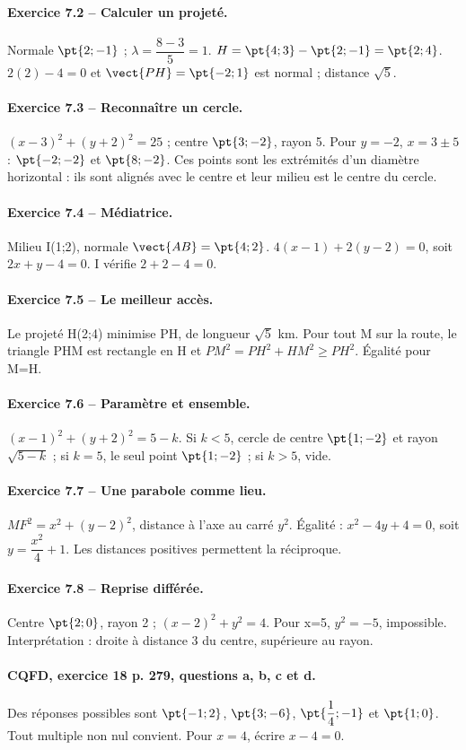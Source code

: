 \paragraph{Exercice 7.2 -- Calculer un projeté.} Normale $\pt{2;-1}$ ; $\lambda =\dfrac{8-3}{5}=1$. $H=\pt{4;3}-\pt{2;-1}=\pt{2;4}$. $2(2)-4=0$ et $\vect{PH}=\pt{-2;1}$ est normal ; distance $\sqrt5$.
\paragraph{Exercice 7.3 -- Reconnaître un cercle.} $(x-3)^2+(y+2)^2=25$ ; centre $\pt{3;-2}$, rayon 5. Pour $y=-2$, $x=3\pm5$ : $\pt{-2;-2}$ et $\pt{8;-2}$. Ces points sont les extrémités d’un diamètre horizontal : ils sont alignés avec le centre et leur milieu est le centre du cercle.
\paragraph{Exercice 7.4 -- Médiatrice.} Milieu I(1;2), normale $\vect{AB}=\pt{4;2}$. $4(x-1)+2(y-2)=0$, soit $2x+y-4=0$. I vérifie $2+2-4=0$.
\paragraph{Exercice 7.5 -- Le meilleur accès.} Le projeté H(2;4) minimise PH, de longueur $\sqrt5$ km. Pour tout M sur la route, le triangle PHM est rectangle en H et $PM^2=PH^2+HM^2\geq PH^2$. Égalité pour M=H.
\paragraph{Exercice 7.6 -- Paramètre et ensemble.} $(x-1)^2+(y+2)^2=5-k$. Si $k<5$, cercle de centre $\pt{1;-2}$ et rayon $\sqrt{5-k}$ ; si $k=5$, le seul point $\pt{1;-2}$ ; si $k>5$, vide.
\paragraph{Exercice 7.7 -- Une parabole comme lieu.} $MF^2=x^2+(y-2)^2$, distance à l’axe au carré $y^2$. Égalité : $x^2-4y+4=0$, soit $y=\dfrac{x^2}{4}+1$. Les distances positives permettent la réciproque.
\paragraph{Exercice 7.8 -- Reprise différée.} Centre $\pt{2;0}$, rayon 2 ; $(x-2)^2+y^2=4$. Pour x=5, $y^2=-5$, impossible. Interprétation : droite à distance 3 du centre, supérieure au rayon.
\paragraph{CQFD, exercice 18 p. 279, questions a, b, c et d.} Des réponses possibles sont $\pt{-1;2}$, $\pt{3;-6}$, $\pt{\dfrac14;-1}$ et $\pt{1;0}$. Tout multiple non nul convient. Pour $x=4$, écrire $x-4=0$.

